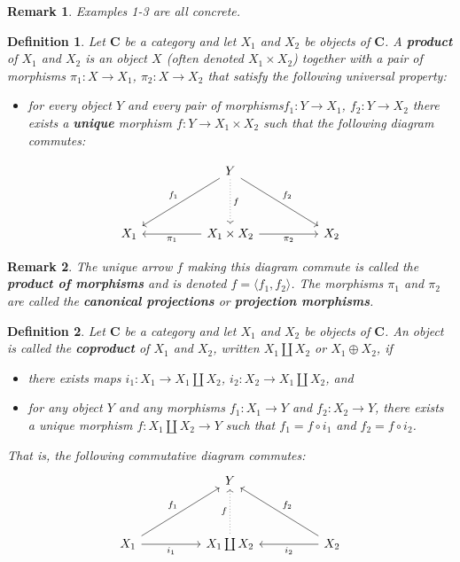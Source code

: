 \documentclass[12pt,reqno]{amsart}
\theoremstyle{plain}
\newtheorem{defi}{Definition}
\newtheorem{rem}{Remark}
\newcommand{\cat}{\mathbf{C}}
\begin{document}
\begin{rem} Examples 1-3 are all concrete. 
\end{rem} 
\begin{defi} Let $\cat$ be a category and let $X_1$ and $X_2$ be objects of $\cat$. A \textbf{product} of $X_1$ and $X_2$ is an object $X$ (often denoted $X_1 \times X_2$) together with a pair of morphisms $\pi_1 \colon X \to X_1$, $\pi_2 \colon X \to X_2$ that satisfy the following universal property:
\begin{itemize}
\item[\textup{$\bullet$}] for every object $Y$ and every pair of morphisms$f_1 \colon Y \to X_1$, $f_2 \colon Y \to X_2$ there exists a \textbf{unique} morphism $f \colon Y \to  X_1 \times X_2$ such that the following diagram commutes: 
\end{itemize}
\[
\begin{tikzcd}
  &  & Y \arrow[lldd, "f_1"'] \arrow[rrdd, "f_2"] \arrow[dd, "f", dotted] &  &   \\
  &  &                                                                &  &   \\
X_1 &  & X_1 \times X_2 \arrow[ll, "\pi_1"] \arrow[rr, "\pi_2"']                             &  & X_2
\end{tikzcd}
\]
\end{defi} 
\begin{rem} The unique arrow $f$ making this diagram commute is called the \textbf{product of morphisms} and is denoted $f = \langle f_1, f_2 \rangle$. The morphisms $\pi_1$ and $\pi_2$ are called the \textbf{canonical projections} or \textbf{projection morphisms}.
\end{rem} 
\begin{defi} Let $\cat$ be a category and let $X_1$ and $X_2$ be objects of $\cat$. An object is called the \textbf{coproduct} of $X_1$ and $X_2$, written $X_1 \coprod X_2$ or $X_1 \oplus X_2$, if
\begin{itemize}
\item[\textup{(i)}] there exists maps $i_1 \colon X_1 \to X_1 \coprod X_2$, $i_2 \colon X_2 \to X_1 \coprod X_2$, and
\item[\textup{(ii)}] for any object $Y$ and any morphisms $f_1 \colon X_1 \to Y$ and $f_2 \colon X_2 \to Y$, there exists a unique morphism $f \colon X_1 \coprod X_2 \to Y$ such that $f_1 = f \circ i_1$ and $f_2 = f \circ i_2$. 
\end{itemize}

That is, the following commutative diagram commutes: 
\[
\begin{tikzcd}
                                     &  & Y                         &  &                                      \\
                                     &  &                           &  &                                      \\
X_1 \arrow[rruu, "f_1"] \arrow[rr, "i_1"'] &  & X_1 \coprod X_2 \arrow[uu, "f", dotted] &  & X_2 \arrow[lluu, "f_2"'] \arrow[ll, "i_2"]
\end{tikzcd}
\]
\end{defi} 
\end{document}
